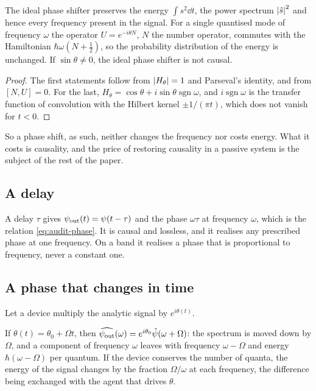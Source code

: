 \begin{proposition}\label{prop:static}
The ideal phase shifter preserves the energy $\int s^2\dd t$, the power
spectrum $\left|\hat s\right|^2$ and hence every frequency present in the signal.
For a single quantised mode of frequency $\omega$ the operator
$U=e^{-i\theta N}$, $N$ the number operator, commutes with the Hamiltonian
$\hbar\omega(N+\frac12)$, so the probability distribution of the energy is
unchanged. If $\sin\theta\ne0$, the ideal phase shifter is not causal.
\end{proposition}

\begin{proof}
The first statements follow from $\left|H_\theta\right|=1$ and Parseval's
identity, and from $[N,U]=0$. For the last, $H_\theta=\cos\theta
+i\sin\theta\operatorname{sgn}\omega$, and $i\operatorname{sgn}\omega$ is the
transfer function of convolution with the Hilbert kernel $\pm1/(\pi t)$,
which does not vanish for $t<0$.
\end{proof}

So a phase shift, as such, neither changes the frequency nor costs energy.
What it costs is causality, and the price of restoring causality in a
passive system is the subject of the rest of the paper.

\subsection{A delay}

A delay $\tau$ gives $\psi_{\rm out}(t)=\psi(t-\tau)$ and the phase
$\omega\tau$ at frequency $\omega$, which is the relation
\eqref{eq:audit-phase}. It is causal and lossless, and it realises any
prescribed phase at one frequency. On a band it realises a phase that is
proportional to frequency, never a constant one.

\subsection{A phase that changes in time}

Let a device multiply the analytic signal by $e^{i\theta(t)}$.

\begin{proposition}\label{prop:slip}
If $\theta(t)=\theta_0+\Omega t$, then
$\widehat{\psi_{\rm out}}(\omega)=e^{i\theta_0}\hat\psi(\omega+\Omega)$: the
spectrum is moved down by $\Omega$, and a component of frequency $\omega$ leaves
with frequency $\omega-\Omega$ and energy $\hbar(\omega-\Omega)$ per
quantum. If the device conserves the number of quanta, the energy of the
signal changes by the fraction $\Omega/\omega$ at each frequency, the
difference being exchanged with the agent that drives $\theta$.
\end{proposition}

